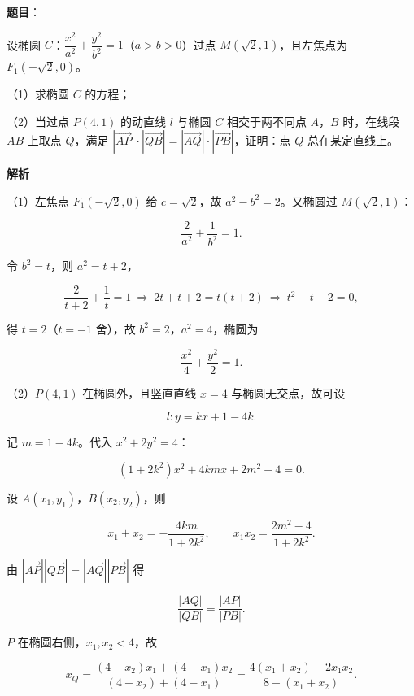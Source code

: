 \begin{answer}

\textbf{题目}：

设椭圆 $C$：$\dfrac{x^2}{a^2}+\dfrac{y^2}{b^2}=1$（$a>b>0$）过点 $M(\sqrt2,1)$，且左焦点为 $F_1(-\sqrt2,0)$。

（1）求椭圆 $C$ 的方程；

（2）当过点 $P(4,1)$ 的动直线 $l$ 与椭圆 $C$ 相交于两不同点 $A$，$B$ 时，在线段 $AB$ 上取点 $Q$，满足 $\left|\overrightarrow{AP}\right|\cdot\left|\overrightarrow{QB}\right|=\left|\overrightarrow{AQ}\right|\cdot\left|\overrightarrow{PB}\right|$，证明：点 $Q$ 总在某定直线上。

\textbf{解析}

（1）左焦点 $F_1(-\sqrt2,0)$ 给 $c=\sqrt2$，故 $a^2-b^2=2$。又椭圆过 $M(\sqrt2,1)$：

\nopagebreak[4]
\[\frac2{a^2}+\frac1{b^2}=1.\]

令 $b^2=t$，则 $a^2=t+2$，

\nopagebreak[4]
\[\frac2{t+2}+\frac1t=1\ \Longrightarrow\ 2t+t+2=t(t+2)\ \Longrightarrow\ t^2-t-2=0,\]

得 $t=2$（$t=-1$ 舍），故 $b^2=2$，$a^2=4$，椭圆为

\nopagebreak[4]
\[\frac{x^2}4+\frac{y^2}2=1.\]

（2）$P(4,1)$ 在椭圆外，且竖直直线 $x=4$ 与椭圆无交点，故可设

\nopagebreak[4]
\[l:y=kx+1-4k.\]

记 $m=1-4k$。代入 $x^2+2y^2=4$：

\nopagebreak[4]
\[(1+2k^2)x^2+4kmx+2m^2-4=0.\]

设 $A(x_1,y_1)$，$B(x_2,y_2)$，则

\nopagebreak[4]
\[x_1+x_2=-\frac{4km}{1+2k^2},\qquad x_1x_2=\frac{2m^2-4}{1+2k^2}.\]

由 $\left|\overrightarrow{AP}\right|\left|\overrightarrow{QB}\right|=\left|\overrightarrow{AQ}\right|\left|\overrightarrow{PB}\right|$ 得

\nopagebreak[4]
\[\frac{|AQ|}{|QB|}=\frac{|AP|}{|PB|}.\]

$P$ 在椭圆右侧，$x_1,x_2<4$，故

\nopagebreak[4]
\[x_Q=\frac{(4-x_2)x_1+(4-x_1)x_2}{(4-x_2)+(4-x_1)}=\frac{4(x_1+x_2)-2x_1x_2}{8-(x_1+x_2)}.\]


\end{answer}
